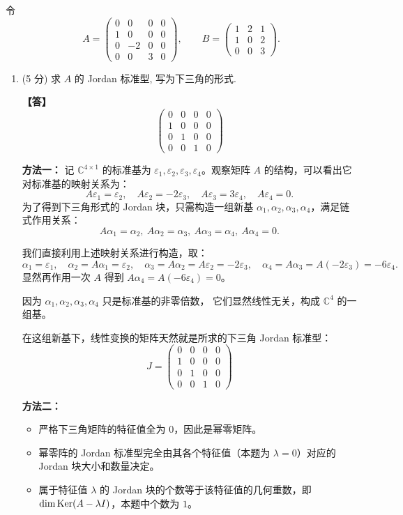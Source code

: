 令
\[A =
\begin{pmatrix}
0 & 0 & 0 & 0 \\
1 & 0 & 0 & 0 \\
0 & -2 & 0 & 0 \\
0 & 0 & 3 & 0
\end{pmatrix},
\qquad
B =
\begin{pmatrix}
1 & 2 & 1 \\
1 & 0 & 2 \\
0 & 0 & 3
\end{pmatrix}.\]
\begin{enumerate}
\item (5 分) 求 $A$ 的 Jordan 标准型, 写为下三角的形式.

\textbf{【答】}
\[
\begin{pmatrix}
0 & 0 & 0 & 0 \\
1 & 0 & 0 & 0 \\
0 & 1 & 0 & 0 \\
0 & 0 & 1 & 0
\end{pmatrix}
\]

\textbf{方法一：} 记 $\mathbb{C}^{4\times 1}$ 的标准基为 $\varepsilon_1,\varepsilon_2,\varepsilon_3,\varepsilon_4$。观察矩阵 $A$ 的结构，可以看出它对标准基的映射关系为：
\[A\varepsilon_1=\varepsilon_2,\quad A\varepsilon_2=-2\varepsilon_3,\quad A\varepsilon_3=3\varepsilon_4,\quad A\varepsilon_4=0.\]
为了得到下三角形式的 Jordan 块，只需构造一组新基 $\alpha_1,\alpha_2,\alpha_3,\alpha_4$，满足链式作用关系：
\[A\alpha_1=\alpha_2,\ A\alpha_2=\alpha_3,\ A\alpha_3=\alpha_4,\ A\alpha_4=0.\]

我们直接利用上述映射关系进行构造，取：
\[\alpha_1=\varepsilon_1,\quad
\alpha_2=A\alpha_1=\varepsilon_2,\quad
\alpha_3=A\alpha_2=A\varepsilon_2=-2\varepsilon_3,\quad
\alpha_4=A\alpha_3=A(-2\varepsilon_3)=-6\varepsilon_4.\]
显然再作用一次 $A$ 得到 $A\alpha_4=A(-6\varepsilon_4)=0$。

因为 $\alpha_1,\alpha_2,\alpha_3,\alpha_4$ 只是标准基的非零倍数，
它们显然线性无关，构成 $\mathbb{C}^4$ 的一组基。

在这组新基下，线性变换的矩阵天然就是所求的下三角 Jordan 标准型：
\[J=
\begin{pmatrix}
0 & 0 & 0 & 0 \\
1 & 0 & 0 & 0 \\
0 & 1 & 0 & 0 \\
0 & 0 & 1 & 0
\end{pmatrix}\]

\textbf{方法二：}
\begin{itemize}
\item 严格下三角矩阵的特征值全为 $0$，因此是幂零矩阵。
\item 幂零阵的 Jordan 标准型完全由其各个特征值（本题为 $\lambda=0$）对应的 Jordan 块大小和数量决定。
\item 属于特征值 $\lambda$ 的 Jordan 块的个数等于该特征值的几何重数，即 $\dim\operatorname{Ker}(A-\lambda I)$，本题中个数为 $1$。
\end{itemize}


\end{enumerate}

